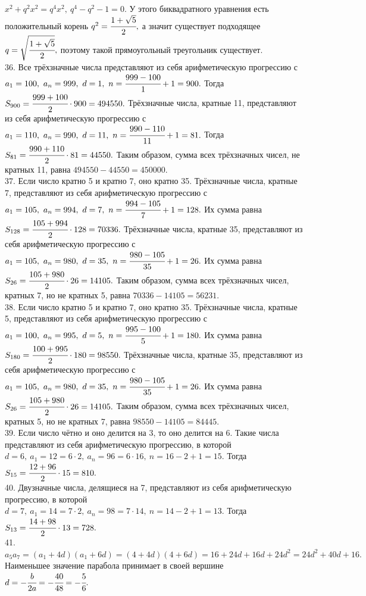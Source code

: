 \documentclass[12pt]{article}
\begin{document}
$x^2+q^2x^2=q^4x^2,\ q^4-q^2-1=0.$ У этого биквадратного уравнения есть положительный корень $q^2=\cfrac{1+\sqrt{5}}{2},$ а значит существует подходящее $q=\sqrt{\cfrac{1+\sqrt{5}}{2}},$ поэтому такой прямоугольный треугольник существует.\\
36. Все трёхзначные числа представляют из себя арифметическую прогрессию с $a_1=100,\ a_n=999,\ d=1,\ n=\cfrac{999-100}{1}+1=900.$ Тогда $S_{900}=\cfrac{999+100}{2}\cdot900=494550.$ Трёхзначные числа, кратные 11, представляют из себя арифметическую прогрессию с $a_1=110,\ a_n=990,\ d=11,\ n=\cfrac{990-110}{11}+1=81.$ Тогда $S_{81}=\cfrac{990+110}{2}\cdot81=44550.$ Таким образом, сумма всех трёхзначных чисел, не кратных 11, равна $494550-44550=450000.$\\
37. Если число кратно 5 и кратно 7, оно кратно 35. Трёхзначные числа, кратные 7, представляют из себя арифметическую прогрессию с $a_1=105,\ a_n=994,\ d=7,\ n=\cfrac{994-105}{7}+1=128.$ Их сумма равна $S_{128}=\cfrac{105+994}{2}\cdot128=70336.$ Трёхзначные числа, кратные 35, представляют из себя арифметическую прогрессию с $a_1=105,\ a_n=980,\ d=35,\ n=\cfrac{980-105}{35}+1=26.$ Их сумма равна $S_{26}=\cfrac{105+980}{2}\cdot26=14105.$ Таким образом, сумма всех трёхзначных чисел, кратных 7, но не кратных 5, равна $70336-14105=56231.$\\
38. Если число кратно 5 и кратно 7, оно кратно 35. Трёхзначные числа, кратные 5, представляют из себя арифметическую прогрессию с $a_1=100,\ a_n=995,\ d=5,\ n=\cfrac{995-100}{5}+1=180.$ Их сумма равна $S_{180}=\cfrac{100+995}{2}\cdot180=98550.$ Трёхзначные числа, кратные 35, представляют из себя арифметическую прогрессию с $a_1=105,\ a_n=980,\ d=35,\ n=\cfrac{980-105}{35}+1=26.$ Их сумма равна $S_{26}=\cfrac{105+980}{2}\cdot26=14105.$ Таким образом, сумма всех трёхзначных чисел, кратных 5, но не кратных 7, равна $98550-14105=84445.$\\
39. Если число чётно и оно делится на 3, то оно делится на 6. Такие числа представляют из себя арифметическую прогрессию, в которой $d=6,\ a_1=12=6\cdot2,\ a_n=96=6\cdot16,\ n=16-2+1=15.$ Тогда $S_{15}=\cfrac{12+96}{2}\cdot15=810.$\\
40. Двузначные числа, делящиеся на 7, представляют из себя арифметическую прогрессию, в которой $d=7,\ a_1=14=7\cdot2,\ a_n=98=7\cdot14,\ n=14-2+1=13.$ Тогда
$S_{13}=\cfrac{14+98}{2}\cdot13=728.$\\
41. $a_5a_7=(a_1+4d)(a_1+6d)=(4+4d)(4+6d)=16+24d+16d+24d^2=24d^2+40d+16.$ Наименьшее значение парабола принимает в своей вершине $d=-\cfrac{b}{2a}=-\cfrac{40}{48}=-\cfrac{5}{6}.$\\
\end{document}
